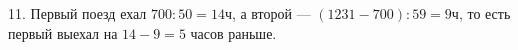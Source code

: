 11. Первый поезд ехал $700:50=14$ч, а второй --- $(1231-700):59=9$ч, то есть первый выехал на $14-9=5$ часов раньше.\\
